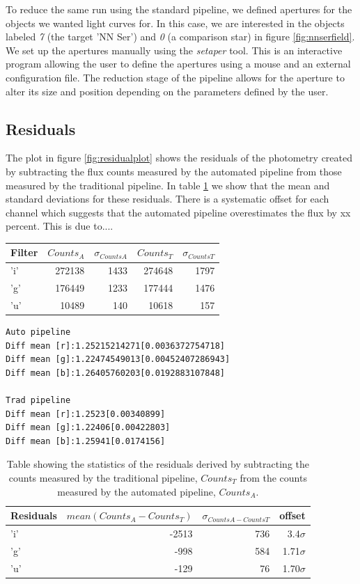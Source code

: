 To reduce the same run using the standard pipeline, we defined apertures for the objects we wanted light curves for. In this case, we are interested in the objects labeled \emph{7} (the target 'NN Ser') and \emph{0} (a comparison star) in figure \ref{fig:nnserfield}. We set up the apertures manually using the \emph{setaper} tool. This is an interactive program allowing the user to define the apertures using a mouse and an external configuration file. The reduction stage of the pipeline allows for the aperture to alter its size and position depending on the parameters defined by the user. 

\subsection{Residuals}
The plot in figure \ref{fig:residualplot} shows the residuals of the photometry created by subtracting the flux counts measured by the automated pipeline from those measured by the traditional pipeline. In table \ref{table:residuals} we show that the mean and standard deviations for these residuals. There is a systematic offset for each channel which suggests that the automated pipeline overestimates the flux by xx percent. This is due to.... 

\begin{center}
	\begin{tabular}{|l|r|r|r|r|}
		\hline
		Filter & $Counts_{A}$ & $\sigma_{Counts A}$ & $Counts_{T}$ & $\sigma_{Counts T}$\\
		\hline
		'i' & 272138 & 1433 &  274648 & 1797\\
		'g' & 176449 & 1233 & 177444  & 1476\\
		'u' & 10489 & 140 & 10618 & 157 \\
		\hline
	\end{tabular}
\end{center}
\begin{verbatim}
Auto pipeline
Diff mean [r]:1.25215214271[0.0036372754718]
Diff mean [g]:1.22474549013[0.00452407286943]
Diff mean [b]:1.26405760203[0.0192883107848]

Trad pipeline
Diff mean [r]:1.2523[0.00340899]
Diff mean [g]:1.22406[0.00422803]
Diff mean [b]:1.25941[0.0174156]

\end{verbatim}

\begin{table}[ht]
  \label{table:residuals}
  \caption{Table showing the statistics of the residuals derived by subtracting the counts measured by the traditional pipeline, $Counts_{T}$ from the counts measured by the automated pipeline, $Counts_{A}$.}
  \centering
  \begin{tabular}{|l|r|r|r|}
    \hline
    Residuals & $mean(Counts_{A}-Counts_{T})$ & $\sigma_{CountsA - CountsT}$ & offset\\
    \hline
    'i' & -2513 & 736 & 3.4$\sigma$\\
    'g' & -998 & 584 & 1.71$\sigma$\\
    'u' & -129 & 76 & 1.70$\sigma$\\
    \hline
   \end{tabular}
\end{table}

